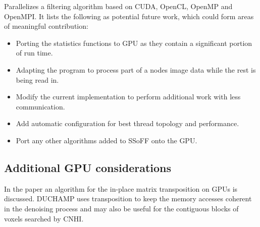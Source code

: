 \documentclass[prodmode,acmtecs]{acmsmall} %
\begin{document}
\cite{westerlund2015performance} Parallelizes a filtering algorithm based on CUDA, OpenCL,
OpenMP and OpenMPI. It lists the following as potential future work, which could form areas 
of meaningful contribution:

\begin{itemize}
\item Porting the statistics functions to GPU as they contain a significant portion of run time.
\item Adapting the program to process part of a nodes image data while the rest is being read in.
\item Modify the current implementation to perform additional work with less communication.
\item Add automatic configuration for best thread topology and performance.
\item Port any other algorithms added to SSoFF onto the GPU.
\end{itemize}


\subsection{Additional GPU considerations}

In the paper \cite{sung2014place} an algorithm for the in-place matrix transposition
on GPUs is discussed. DUCHAMP uses transposition to keep the memory accesses coherent in the denoising
process and may also be useful for the contiguous blocks of voxels searched by CNHI.



\end{document}
